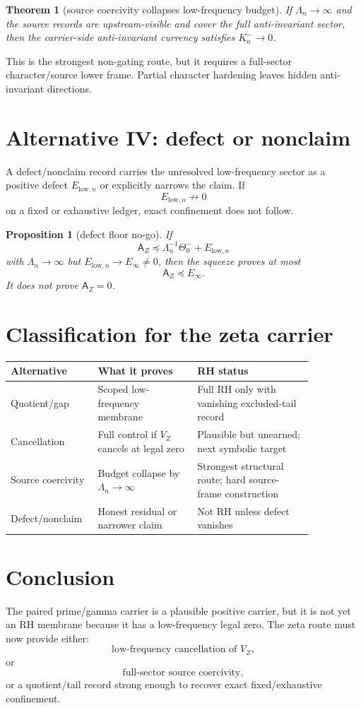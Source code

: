 \documentclass[11pt]{article}
\newtheorem{theorem}{Theorem}
\newtheorem{proposition}{Proposition}
\begin{document}
\begin{theorem}[source coercivity collapses low-frequency budget]
If \(\Lambda_n\to\infty\) and the source records are upstream-visible and cover the full anti-invariant sector, then the carrier-side anti-invariant currency satisfies \(K_n^-\to0\).
\end{theorem}

This is the strongest non-gating route, but it requires a full-sector character/source lower frame.  Partial character hardening leaves hidden anti-invariant directions.

\section{Alternative IV: defect or nonclaim}

A defect/nonclaim record carries the unresolved low-frequency sector as a positive defect \(E_{\mathrm{low},n}\) or explicitly narrows the claim.  If
\[
E_{\mathrm{low},n}\not\to0
\]
on a fixed or exhaustive ledger, exact confinement does not follow.

\begin{proposition}[defect floor no-go]
If
\[
\mathsf A_Z\preceq \Lambda_n^{-1}\Theta_0^-+E_{\mathrm{low},n}
\]
with \(\Lambda_n\to\infty\) but \(E_{\mathrm{low},n}\to E_\infty\ne0\), then the squeeze proves at most
\[
\mathsf A_Z\preceq E_\infty.
\]
It does not prove \(\mathsf A_Z=0\).
\end{proposition}

\section{Classification for the zeta carrier}

\begin{center}
\begin{tabular}{p{0.2\linewidth}p{0.3\linewidth}p{0.35\linewidth}}
\hline
Alternative & What it proves & RH status\\
\hline
Quotient/gap & Scoped low-frequency membrane & Full RH only with vanishing excluded-tail record\\
Cancellation & Full control if \(V_Z\) cancels at legal zero & Plausible but unearned; next symbolic target\\
Source coercivity & Budget collapse by \(\Lambda_n\to\infty\) & Strongest structural route; hard source-frame construction\\
Defect/nonclaim & Honest residual or narrower claim & Not RH unless defect vanishes\\
\hline
\end{tabular}
\end{center}

\section{Conclusion}

The paired prime/gamma carrier is a plausible positive carrier, but it is not yet an RH membrane because it has a low-frequency legal zero. The zeta route must now provide either:
\[
\text{low-frequency cancellation of }V_Z,
\]
or
\[
\text{full-sector source coercivity},
\]
or a quotient/tail record strong enough to recover exact fixed/exhaustive confinement.
\end{document}
